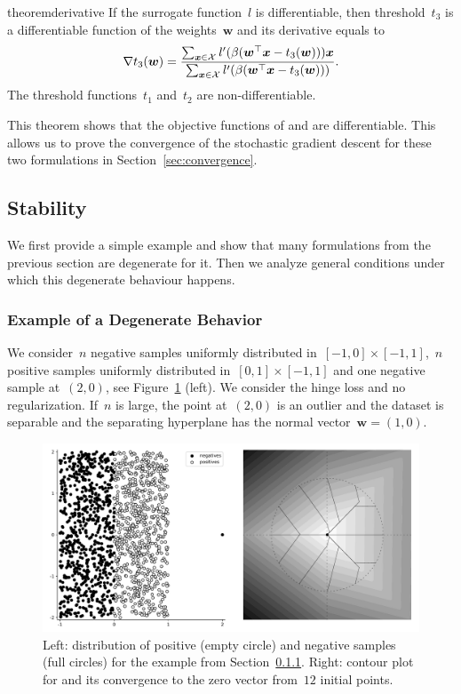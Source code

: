 \begin{restatable}{theorem}{derivative}\label{thm:derivative}
  If the surrogate function~$l$ is differentiable, then threshold~$t_3$ is a differentiable function of the weights~$\bm{w}$ and its derivative equals to
  \begin{equation*}
    \nabla t_3(\bm{w}) = \frac{\sum_{\bm{x} \in \mathcal{X}} l'(\beta(\bm{w}^\top \bm{x} - t_3(\bm{w})))\bm{x}}{\sum_{\bm{x} \in \mathcal{X}}l'(\beta(\bm{w}^\top \bm{x} - t_3(\bm{w})))}.
  \end{equation*}
  The threshold functions~$t_1$ and~$t_2$ are non-differentiable.
\end{restatable}

\noindent This theorem shows that the objective functions of \PatMat and \PatMatNP are differentiable. This allows us to prove the convergence of the stochastic gradient descent for these two formulations in Section~\ref{sec:convergence}.

\subsection{Stability}\label{sec:stability}

We first provide a simple example and show that many formulations from the previous section are degenerate for it. Then we analyze general conditions under which this degenerate behaviour happens.

\subsubsection{Example of a Degenerate Behavior}\label{sec:example}

We consider~$n$ negative samples uniformly distributed in~$[-1,0]\times[-1,1]$,~$n$ positive samples uniformly distributed in~$[0,1]\times[-1,1]$ and one negative sample at~$(2,0)$, see Figure~\ref{fig:example} (left). We consider the hinge loss and no regularization. If~$n$ is large, the point at~$(2,0)$ is an outlier and the dataset is separable and the separating hyperplane has the normal vector~$\bm{w}=(1,0)$. 

\begin{figure}[!ht]
  \centering
  \includegraphics[width=0.7\linewidth]{images/toppush_convergence.pdf}
  \caption{Left: distribution of positive (empty circle) and negative samples (full circles) for the example from Section~\ref{sec:example}. Right: contour plot for \TopPush and its convergence to the zero vector from~$12$ initial points.}
  \label{fig:example}
\end{figure}

